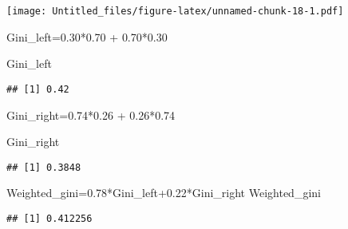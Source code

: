\documentclass[
]{article}
\newenvironment{Shaded}{\begin{snugshade}}{\end{snugshade}}
\newcommand{\FloatTok}[1]{\textcolor[rgb]{0.00,0.00,0.81}{#1}}
\newcommand{\NormalTok}[1]{#1}
\newcommand{\OtherTok}[1]{\textcolor[rgb]{0.56,0.35,0.01}{#1}}
\newcommand{\SpecialCharTok}[1]{\textcolor[rgb]{0.00,0.00,0.00}{#1}}
\begin{document}
\texttt{[image: Untitled\_files/figure-latex/unnamed-chunk-18-1.pdf]}

\begin{Shaded}
\begin{Highlighting}[]
\NormalTok{Gini\_left}\OtherTok{=}\FloatTok{0.30}\SpecialCharTok{*}\FloatTok{0.70} \SpecialCharTok{+} \FloatTok{0.70}\SpecialCharTok{*}\FloatTok{0.30}

\NormalTok{Gini\_left}
\end{Highlighting}
\end{Shaded}

\begin{verbatim}
## [1] 0.42
\end{verbatim}

\begin{Shaded}
\begin{Highlighting}[]
\NormalTok{Gini\_right}\OtherTok{=}\FloatTok{0.74}\SpecialCharTok{*}\FloatTok{0.26} \SpecialCharTok{+} \FloatTok{0.26}\SpecialCharTok{*}\FloatTok{0.74}

\NormalTok{Gini\_right}
\end{Highlighting}
\end{Shaded}

\begin{verbatim}
## [1] 0.3848
\end{verbatim}

\begin{Shaded}
\begin{Highlighting}[]
\NormalTok{Weighted\_gini}\OtherTok{=}\FloatTok{0.78}\SpecialCharTok{*}\NormalTok{Gini\_left}\FloatTok{+0.22}\SpecialCharTok{*}\NormalTok{Gini\_right }
\NormalTok{Weighted\_gini}
\end{Highlighting}
\end{Shaded}

\begin{verbatim}
## [1] 0.412256
\end{verbatim}
\end{document}
